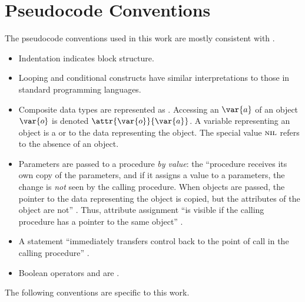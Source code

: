 \chapter{Pseudocode Conventions}\label{sec:conventions}

\newcommand{\vSomeObject}{\var{o}}
\newcommand{\vSomeAttribute}{\var{a}}
\newcommand{\aSomeObjectAttribute}{\attr{\vSomeObject}{\vSomeAttribute}}

\newcommand{\vSomeElement}{x}
\newcommand{\vSomeSet}{\vSet{X}}

The pseudocode conventions used in this work are mostly consistent with \cite{Cormen2022}.

\begin{itemize}
    \item Indentation indicates block structure.
    \item Looping and conditional constructs have similar interpretations to those in standard programming languages.
    \item Composite data types are represented as . Accessing an  $\vSomeAttribute$ of an object $\vSomeObject$ is denoted
    $\aSomeObjectAttribute$. A variable representing an object is a  or  to the data representing the object. The special value
    $\textsc{nil}$ refers to the absence of an object.
    \item Parameters are passed to a procedure \emph{by value}: the ``procedure receives its own copy of the parameters, and if it assigns a value to a parameters, the change is \emph{not} seen by the calling procedure. When objects are passed, the pointer to the data representing the object is copied, but the attributes of the object are not'' \cite{Cormen2022}. Thus, attribute assignment ``is visible if the calling procedure has a pointer to the same object'' \cite{Cormen2022}.
    \item A {\Return} statement ``immediately transfers control back to the point of call in the calling procedure'' \cite{Cormen2022}.
    \item Boolean operators {\AND} and {\OR} are .
\end{itemize}

\noindent The following conventions are specific to this work.

